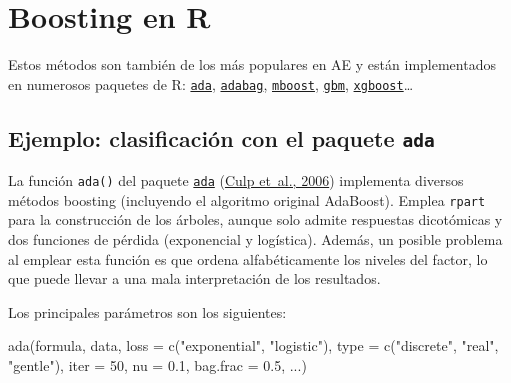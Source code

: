 \documentclass[
  spanish,
]{book}
\newenvironment{Shaded}{\begin{snugshade}}{\end{snugshade}}
\newcommand{\AttributeTok}[1]{\textcolor[rgb]{0.77,0.63,0.00}{#1}}
\newcommand{\DecValTok}[1]{\textcolor[rgb]{0.00,0.00,0.81}{#1}}
\newcommand{\FloatTok}[1]{\textcolor[rgb]{0.00,0.00,0.81}{#1}}
\newcommand{\FunctionTok}[1]{\textcolor[rgb]{0.00,0.00,0.00}{#1}}
\newcommand{\NormalTok}[1]{#1}
\newcommand{\StringTok}[1]{\textcolor[rgb]{0.31,0.60,0.02}{#1}}
\theoremstyle{break}
\theoremstyle{definition}
\theoremstyle{definition}
\theoremstyle{definition}
\theoremstyle{definition}
\theoremstyle{remark}
\begin{document}
\hypertarget{boosting-en-r}{%
\section{Boosting en R}\label{boosting-en-r}}

Estos métodos son también de los más populares en AE y están implementados en numerosos paquetes de R: \href{https://CRAN.R-project.org/package=ada}{\texttt{ada}}, \href{https://CRAN.R-project.org/package=adabag}{\texttt{adabag}}, \href{https://CRAN.R-project.org/package=mboost}{\texttt{mboost}}, \href{https://CRAN.R-project.org/package=gbm}{\texttt{gbm}}, \href{https://github.com/dmlc/xgboost/tree/master/R-package}{\texttt{xgboost}}\ldots{}

\hypertarget{ejemplo-clasificaciuxf3n-con-el-paquete-ada}{%
\subsection{\texorpdfstring{Ejemplo: clasificación con el paquete \texttt{ada}}{Ejemplo: clasificación con el paquete ada}}\label{ejemplo-clasificaciuxf3n-con-el-paquete-ada}}

La función \texttt{ada()} del paquete \href{https://CRAN.R-project.org/package=ada}{\texttt{ada}} (\protect\hyperlink{ref-culp2006ada}{Culp et~al., 2006}) implementa diversos métodos boosting (incluyendo el algoritmo original AdaBoost).
Emplea \texttt{rpart} para la construcción de los árboles, aunque solo admite respuestas dicotómicas y dos funciones de pérdida (exponencial y logística).
Además, un posible problema al emplear esta función es que ordena alfabéticamente los niveles del factor, lo que puede llevar a una mala interpretación de los resultados.

Los principales parámetros son los siguientes:

\begin{Shaded}
\begin{Highlighting}[]
\FunctionTok{ada}\NormalTok{(formula, data, }\AttributeTok{loss =} \FunctionTok{c}\NormalTok{(}\StringTok{"exponential"}\NormalTok{, }\StringTok{"logistic"}\NormalTok{),}
    \AttributeTok{type =} \FunctionTok{c}\NormalTok{(}\StringTok{"discrete"}\NormalTok{, }\StringTok{"real"}\NormalTok{, }\StringTok{"gentle"}\NormalTok{), }\AttributeTok{iter =} \DecValTok{50}\NormalTok{, }
    \AttributeTok{nu =} \FloatTok{0.1}\NormalTok{, }\AttributeTok{bag.frac =} \FloatTok{0.5}\NormalTok{, ...)}
\end{Highlighting}
\end{Shaded}
\end{document}
